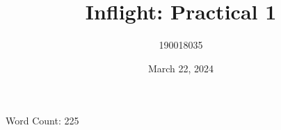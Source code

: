 \documentclass{article}
\title{Inflight: Practical 1}
\author{190018035}
\date{March 22, 2024}
\begin{document}
\maketitle

\tableofcontents

\begin{introduction}

\end{introduction}

\begin{part1}

\end{part1}

\begin{part2}

\end{part2}

\begin{part3}

\end{part3}

\begin{evaluation}

\end{evaluation}

\begin{conclusion}

\end{conclusion}

\noindent Word Count: 225

\printbibliography
\end{document}
